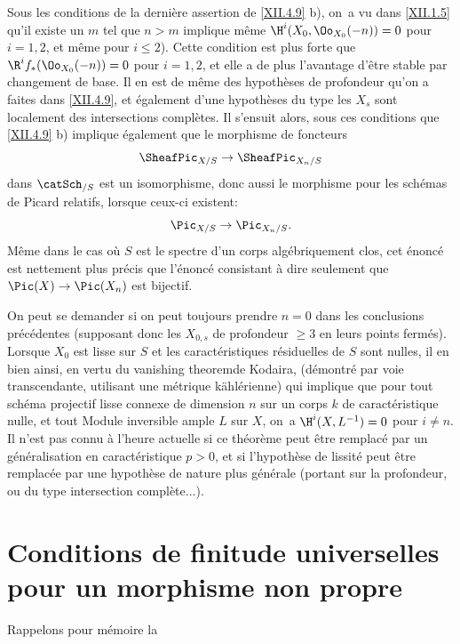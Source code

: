 \begin{remarque} \label{XII.4.10}
Sous les conditions de la derni\`ere assertion de \ref{XII.4.9} b), on~a vu dans \ref{XII.1.5} qu'il existe un $m$ tel que $n>m$ implique m\^eme $\H^i(X_0, \Oo_{X_0}(-n))=0$ pour $i=1, 2$, et m\^eme pour $i\leq 2$). Cette condition est plus forte que $\R^if_{\ast}(\Oo_{X_0}(-n))=0$ pour $i=1, 2$, et elle a de plus l'avantage d'\^etre stable par changement de base. Il en est de m\^eme des hypoth\`eses de profondeur qu'on a faites dans \ref{XII.4.9}, et \'egalement d'une hypoth\`eses du type \og les $X_s$ sont localement des intersections compl\`etes\fg. Il s'ensuit alors, sous ces conditions que \ref{XII.4.9} b) implique \'egalement que le morphisme de foncteurs
\[
\SheafPic_{X/S}\to \SheafPic_{X_n/S}
\]
dans $\catSch_{/S}$ est un isomorphisme, donc aussi le morphisme pour les sch\'emas de Picard relatifs, lorsque ceux-ci existent:
\[
\Pic_{X/S}\to \Pic_{X_n/S}.
\]
M\^eme dans le cas o\`u $S$ est le spectre d'un corps alg\'ebriquement clos, cet \'enonc\'e est nettement plus pr\'ecis que l'\'enonc\'e consistant \`a dire seulement que $\Pic(X)\to \Pic(X_n)$ est bijectif.

On peut se demander si on peut toujours prendre $n=0$ dans les conclusions pr\'ec\'edentes (supposant donc les $X_{0, s}$ de profondeur $\geq 3$ en leurs points ferm\'es). Lorsque $X_0$ est lisse sur $S$ et les caract\'eristiques r\'esiduelles de $S$ sont nulles, il en bien ainsi, en vertu du \og vanishing theorem\fg de Kodaira, (d\'emontr\'e par voie transcendante, utilisant une m\'etrique k\"ahl\'erienne) qui implique que pour tout sch\'ema projectif lisse connexe de dimension $n$ sur un corps $k$ de caract\'eristique nulle, et tout Module inversible ample $L$ sur $X$, on~a $\H^i(X, L^{-1})=0$ pour $i\neq n$. Il n'est pas connu \`a l'heure actuelle si ce th\'eor\`eme peut \^etre remplac\'e par un g\'en\'eralisation en caract\'eristique $p>0$, et si l'hypoth\`ese de lissit\'e peut \^etre remplac\'ee par une hypoth\`ese de nature plus g\'en\'erale (portant sur la profondeur, ou du type \og intersection compl\`ete\fg...).
\end{remarque}

\section[Conditions de finitude universelles]
{Conditions de finitude universelles pour un morphisme non propre} \label{XII.5} Rappelons pour m\'emoire la \setcounter{equation}{25}

